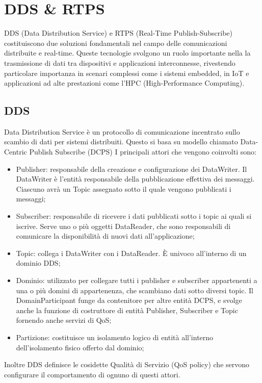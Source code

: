 \chapter{DDS \& RTPS}
DDS (Data Distribution Service)\cite{DDS} e RTPS (Real-Time Publish-Subscribe)\cite{RTPS} costituiscono due soluzioni fondamentali nel campo delle comunicazioni distribuite e real-time. Queste tecnologie svolgono un ruolo importante nella la trasmissione di dati tra dispositivi e applicazioni interconnesse, rivestendo particolare importanza in scenari complessi come i sistemi embedded, in IoT e applicazioni ad alte prestazioni come l'HPC (High-Performance Computing). 

\section{DDS}
Data Distribution Service è un protocollo di comunicazione incentrato sullo scambio di dati per sistemi distribuiti. Questo si basa su modello chiamato Data-Centric Publish Subscribe (DCPS) I principali attori che vengono coinvolti sono:
\begin{itemize}
    \item Publisher: responsabile della creazione e configurazione dei DataWriter. Il DataWriter è l'entità responsabile della pubblicazione effettiva dei messaggi. Ciascuno avrà un Topic assegnato sotto il quale vengono pubblicati i messaggi;

    \item Subscriber: responsabile di ricevere i dati pubblicati sotto i topic ai quali si iscrive. Serve uno o più oggetti DataReader, che sono responsabili di comunicare la disponibilità di nuovi dati all'applicazione;

    \item Topic: collega i DataWriter con i DataReader. È univoco all'interno di un dominio DDS;
    
    \item Dominio: utilizzato per collegare tutti i publisher e subscriber appartenenti a una o più domini di appartenenza, che scambiano dati sotto diversi topic. Il DomainParticipant funge da contenitore per altre entità DCPS, e svolge anche la funzione di costruttore di entità Publisher, Subscriber e Topic fornendo anche servizi di QoS;

    \item Partizione: costituisce un isolamento logico di entità all'interno dell'isolamento fisico offerto dal dominio;

\end{itemize}
Inoltre DDS definisce le cosidette Qualità di Servizio (QoS policy) che servono configurare il comportamento di ognuno di questi attori.


